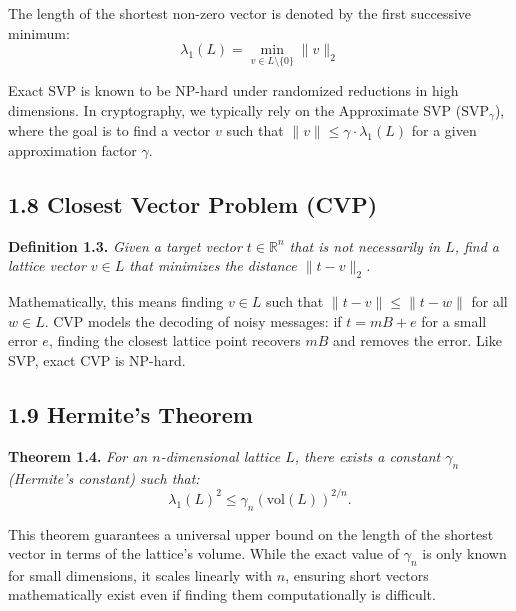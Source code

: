 \documentclass[12pt, a4paper]{article}
\theoremstyle{definition}
\theoremstyle{plain}
\begin{document}
\vspace{0.3cm}
The length of the shortest non-zero vector is denoted by the first successive minimum:
\[
\lambda_1(L) = \min_{v \in L\setminus\{0\}} \|v\|_2
\]

Exact SVP is known to be NP-hard under randomized reductions in high dimensions. In cryptography, we typically rely on the Approximate SVP ($\text{SVP}_\gamma$), where the goal is to find a vector $v$ such that $\|v\| \leq \gamma \cdot \lambda_1(L)$ for a given approximation factor $\gamma$.

\vspace{0.5cm}

\subsection*{1.8 \quad Closest Vector Problem (CVP)}

\noindent \textbf{Definition 1.3.} \textit{Given a target vector $t \in \mathbb{R}^n$ that is not necessarily in $L$, find a lattice vector $v \in L$ that minimizes the distance $\|t - v\|_2$.}

\vspace{0.3cm}
Mathematically, this means finding $v \in L$ such that $\|t - v\| \leq \|t - w\|$ for all $w \in L$. CVP models the decoding of noisy messages: if $t = mB + e$ for a small error $e$, finding the closest lattice point recovers $mB$ and removes the error. Like SVP, exact CVP is NP-hard.

\vspace{0.5cm}

\subsection*{1.9 \quad Hermite's Theorem}

\noindent \textbf{Theorem 1.4.} \textit{For an $n$-dimensional lattice $L$, there exists a constant $\gamma_n$ (Hermite's constant) such that:}
\[
\lambda_1(L)^2 \leq \gamma_n (\text{vol}(L))^{2/n}.
\]

\vspace{0.3cm}
This theorem guarantees a universal upper bound on the length of the shortest vector in terms of the lattice's volume. While the exact value of $\gamma_n$ is only known for small dimensions, it scales linearly with $n$, ensuring short vectors mathematically exist even if finding them computationally is difficult.

\vspace{0.5cm}
\end{document}
